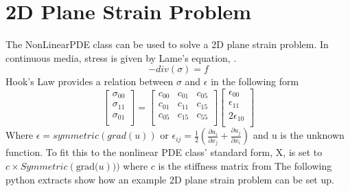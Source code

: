\section{2D Plane Strain Problem}
The NonLinearPDE class can be used to solve a 2D plane strain problem. In continuous media, stress is given by Lame's equation, .
\begin{equation} 
-div(\sigma)=f
\label{symbolic eq2}
\end{equation} 
Hook's Law provides a relation between $\sigma$ and $\epsilon$ in the following form
\begin{equation}
\left[ \begin{array}{c}
\sigma_{00} \\
\sigma_{11} \\
\sigma_{01} \\
\end{array} \right] = 
\left[ \begin{array}{ccc}
c_{00} & c_{01} & c_{05}\\
c_{01} & c_{11} & c_{15}\\
c_{05} & c_{15} & c_{55}\\
\end{array}\right]
\left[ \begin{array}{c}
\epsilon_{00} \\
\epsilon_{11} \\
2\epsilon_{10} \\
\end{array} \right]
\label{symbolic eq3}
\end{equation}
Where $\epsilon = symmetric(grad(u)) \text{ or } \epsilon_{ij}=\frac{1}{2}\left(\frac{\partial u_i}{\partial x_j} + {\frac{\partial u_j}{\partial x_i}}\right)$ and 
u is the unknown function. To fit this to the nonlinear PDE class' standard form, X, is set to $c \times Symmetric(\text{grad(}u)))$ where $c$ is the stiffness matrix from 
The following python extracts show how an example 2D plane strain problem can be set up. 


